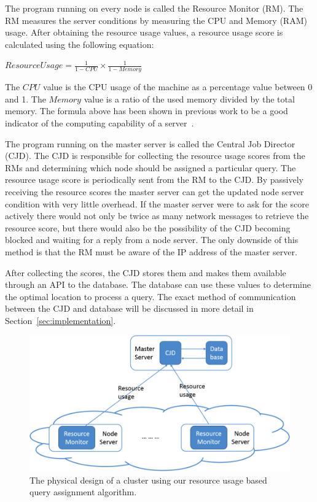 The program running on every node is called the Resource Monitor (RM). The RM measures the server conditions by measuring the CPU and Memory (RAM) usage. After obtaining the resource usage values, a resource usage score is calculated using the following equation:

\begin{center}
$ResourceUsage = \frac{1}{1-CPU} \times \frac{1}{1-Memory}$
\end{center}

The $CPU$ value is the CPU usage of the machine as a percentage value between 0 and 1. The $Memory$ value is a ratio of the used memory divided by the total memory. The formula above has been shown in previous work to be a good indicator of the computing capability of a server~\cite{Wood:2007:BGS:1973430.1973447}.

The program running on the master server is called the Central Job Director (CJD). The CJD is responsible for collecting the resource usage scores from the RMs and determining which node should be assigned a particular query. The resource usage score is periodically sent from the RM to the CJD. By passively receiving the resource scores the master server can get the updated node server condition with very little overhead. If the master server were to ask for the score actively there would not only be twice as many network messages to retrieve the resource score, but there would also be the possibility of the CJD becoming blocked and waiting for a reply from a node server. The only downside of this method is that the RM must be aware of the IP address of the master server. 

After collecting the scores, the CJD stores them and makes them available through an API to the database. The database can use these values to determine the optimal location to process a query. The exact method of communication between the CJD and database will be discussed in more detail in Section~\ref{sec:implementation}.

\begin{figure}[t]
\centering
\includegraphics[scale=0.5]{images/design.png}
\caption{The physical design of a cluster using our resource usage based query assignment algorithm.}
\label{fig:designFig}
\end{figure}

